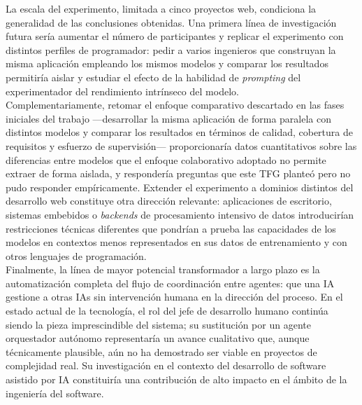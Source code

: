 La escala del experimento, limitada a cinco proyectos web, condiciona la generalidad de las conclusiones obtenidas. Una primera línea de investigación futura sería aumentar el número de participantes y replicar el experimento con distintos perfiles de programador: pedir a varios ingenieros que construyan la misma aplicación empleando los mismos modelos y comparar los resultados permitiría aislar y estudiar el efecto de la habilidad de \textit{prompting} del experimentador del rendimiento intrínseco del modelo.\\

Complementariamente, retomar el enfoque comparativo descartado en las fases iniciales del trabajo ---desarrollar la misma aplicación de forma paralela con distintos modelos y comparar los resultados en términos de calidad, cobertura de requisitos y esfuerzo de supervisión--- proporcionaría datos cuantitativos sobre las diferencias entre modelos que el enfoque colaborativo adoptado no permite extraer de forma aislada, y respondería preguntas que este \ac{TFG} planteó pero no pudo responder empíricamente. Extender el experimento a dominios distintos del desarrollo web constituye otra dirección relevante: aplicaciones de escritorio, sistemas embebidos o \textit{backends} de procesamiento intensivo de datos introducirían restricciones técnicas diferentes que pondrían a prueba las capacidades de los modelos en contextos menos representados en sus datos de entrenamiento y con otros lenguajes de programación.\\

Finalmente, la línea de mayor potencial transformador a largo plazo es la automatización completa del flujo de coordinación entre agentes: que una \ac{IA} gestione a otras \ac{IAs} sin intervención humana en la dirección del proceso. En el estado actual de la tecnología, el rol del jefe de desarrollo humano continúa siendo la pieza imprescindible del sistema; su sustitución por un agente orquestador autónomo representaría un avance cualitativo que, aunque técnicamente plausible, aún no ha demostrado ser viable en proyectos de complejidad real. Su investigación en el contexto del desarrollo de software asistido por \ac{IA} constituiría una contribución de alto impacto en el ámbito de la ingeniería del software.